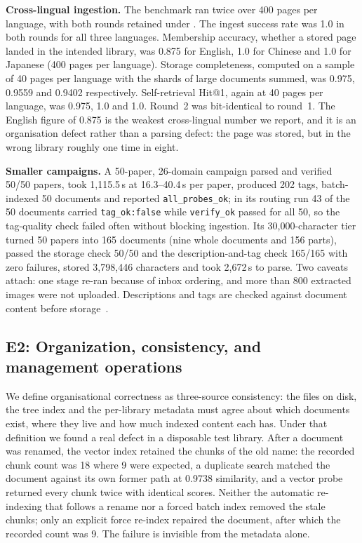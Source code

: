 \textbf{Cross-lingual ingestion.} The benchmark ran twice over 400 pages per language, with both rounds retained under . The ingest success rate was 1.0 in both rounds for all three languages. Membership accuracy, whether a stored page landed in the intended library, was 0.875 for English, 1.0 for Chinese and 1.0 for Japanese (400 pages per language). Storage completeness, computed on a sample of 40 pages per language with the shards of large documents summed, was 0.975, 0.9559 and 0.9402 respectively. Self-retrieval Hit@1, again at 40 pages per language, was 0.975, 1.0 and 1.0. Round~2 was bit-identical to round~1. The English figure of 0.875 is the weakest cross-lingual number we report, and it is an organisation defect rather than a parsing defect: the page was stored, but in the wrong library roughly one time in eight.

\textbf{Smaller campaigns.} A 50-paper, 26-domain campaign parsed and verified 50/50 papers, took 1{,}115.5\,s at 16.3--40.4\,s per paper, produced 202 tags, batch-indexed 50 documents and reported \texttt{all\_probes\_ok}; in its routing run 43 of the 50 documents carried \texttt{tag\_ok:false} while \texttt{verify\_ok} passed for all 50, so the tag-quality check failed often without blocking ingestion. Its 30{,}000-character tier turned 50 papers into 165 documents (nine whole documents and 156 parts), passed the storage check 50/50 and the description-and-tag check 165/165 with zero failures, stored 3{,}798{,}446 characters and took 2{,}672\,s to parse. Two caveats attach: one stage re-ran because of inbox ordering, and more than 800 extracted images were not uploaded. Descriptions and tags are checked against document content before storage~\cite{park-metadata-quality-2009}.

\subsection{E2: Organization, consistency, and management operations}
\label{sec:e2}

We define organisational correctness as three-source consistency: the files on disk, the tree index and the per-library metadata must agree about which documents exist, where they live and how much indexed content each has. Under that definition we found a real defect in a disposable test library. After a document was renamed, the vector index retained the chunks of the old name: the recorded chunk count was 18 where 9 were expected, a duplicate search matched the document against its own former path at 0.9738 similarity, and a vector probe returned every chunk twice with identical scores. Neither the automatic re-indexing that follows a rename nor a forced batch index removed the stale chunks; only an explicit force re-index repaired the document, after which the recorded count was 9. The failure is invisible from the metadata alone.

